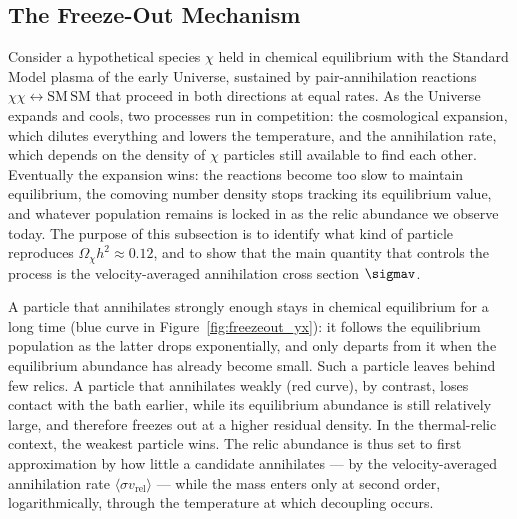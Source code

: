
\subsection{The Freeze-Out Mechanism}
\label{sec:1.2.2}

Consider a hypothetical species $\chi$ held in chemical equilibrium with the Standard Model plasma of the early Universe, sustained by pair-annihilation reactions $\chi\chi \leftrightarrow \mathrm{SM}\,\mathrm{SM}$ that proceed in both directions at equal rates.
As the Universe expands and cools, two processes run in competition: the cosmological expansion, which dilutes everything and lowers the temperature, and the annihilation rate, which depends on the density of $\chi$ particles still available to find each other.
Eventually the expansion wins: the reactions become too slow to maintain equilibrium, the comoving number density stops tracking its equilibrium value, and whatever population remains is locked in as the relic abundance we observe today.
The purpose of this subsection is to identify what kind of particle reproduces $\Omega_\chi h^2 \approx 0.12$, and to show that the main quantity that controls the process is the velocity-averaged annihilation cross section $\sigmav$.

A particle that annihilates strongly enough stays in chemical equilibrium for a long time (blue curve in Figure~\ref{fig:freezeout_yx}): it follows the equilibrium population as the latter drops exponentially, and only departs from it when the equilibrium abundance has already become small.
Such a particle leaves behind few relics.
A particle that annihilates weakly (red curve), by contrast, loses contact with the bath earlier, while its equilibrium abundance is still relatively large, and therefore freezes out at a higher residual density.
In the thermal-relic context, the weakest particle wins.
The relic abundance is thus set to first approximation by how little a candidate annihilates --- by the velocity-averaged annihilation rate $\langle \sigma v_\mathrm{rel}\rangle$ --- while the mass enters only at second order, logarithmically, through the temperature at which decoupling occurs.


